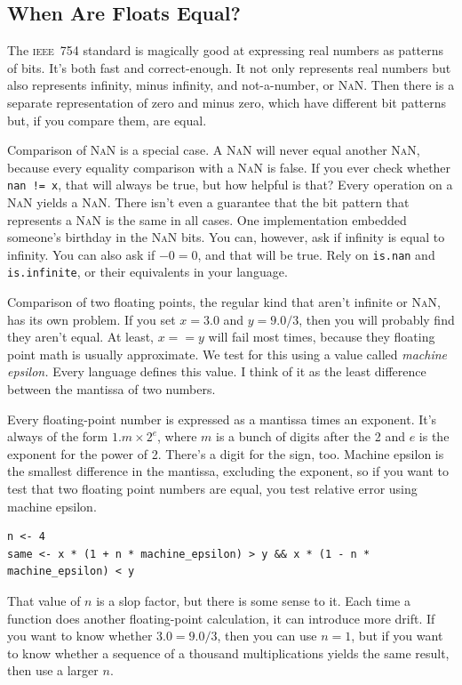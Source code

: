 \documentclass[fleqn,10pt]{olplainarticle}
\newcommand{\nan}{\textsc{NaN}\xspace}
\newcommand{\ieee}{\textsc{ieee}\xspace}
\begin{document}
\subsection{When Are Floats Equal?}
The \ieee~754 standard is magically good at expressing real numbers as
patterns of bits. It's both fast and correct-enough. It not only represents
real numbers but also represents infinity, minus infinity, and
not-a-number, or \nan. Then there is a separate representation of
zero and minus zero, which have different bit patterns but, if you compare
them, are equal.

Comparison of \nan is a special case.
A \nan will never equal another \nan, because every equality comparison with
a \nan is false. If you ever check whether \lstinline|nan != x|, that will
always be true, but how helpful is that?
Every operation
on a \nan yields a \nan. There isn't even a guarantee that the bit
pattern that represents a \nan is the same in all cases.
One implementation embedded someone's birthday in the \nan bits.
You can, however, ask if infinity
is equal to infinity. You can also ask if
$-0=0$, and that will be true. Rely on \lstinline!is.nan! and
\lstinline!is.infinite!, or their equivalents in your language.

Comparison of two floating points, the regular kind that aren't
infinite or \nan, has its own problem. If you set
$x = 3.0$ and $y=9.0 / 3$, then you will probably find they
aren't equal. At least, $x==y$ will fail most times, because
they floating point math is usually approximate. We test for this
using a value called \emph{machine epsilon.} Every language defines
this value. I think of it as the least difference between the
mantissa of two numbers.

Every floating-point number is expressed as a mantissa times
an exponent. It's always of the form $1.m \times 2^e$, where
$m$ is a bunch of digits after the 2 and $e$ is the exponent
for the power of 2. There's a digit for the sign, too.
Machine epsilon is the smallest difference in the mantissa,
excluding the exponent, so if you want to test that two
floating point numbers are equal, you test relative error using
machine epsilon.
\begin{lstlisting}
n <- 4
same <- x * (1 + n * machine_epsilon) > y && x * (1 - n * machine_epsilon) < y
\end{lstlisting}
That value of $n$ is a slop factor, but there is some sense
to it. Each time a function does another floating-point calculation,
it can introduce more drift. If you want to know whether
$3.0 = 9.0 / 3$, then you can use $n=1$, but if you want to know
whether a sequence of a thousand multiplications yields the
same result, then use a larger $n$.
\end{document}
